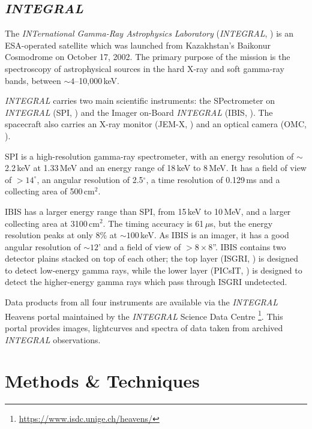 \subsection{\textit{INTEGRAL}}

\par The \textit{INTernational Gamma-Ray Astrophysics Laboratory} (\textit{INTEGRAL}, \citealp{Winkler_INTEGRAL}) is an ESA-operated satellite which was launched from Kazakhstan's Baikonur Cosmodrome on October 17, 2002.  The primary purpose of the mission is the spectroscopy of astrophysical sources in the hard X-ray and soft gamma-ray bands, between $\sim4$--10,000\,keV.
\par \textit{INTEGRAL} carries two main scientific instruments: the SPectrometer on \textit{INTEGRAL} (SPI, \citealp{Vedrenne_SPI}) and the Imager on-Board \textit{INTEGRAL} (IBIS, \citealp{Winkler_IBIS}).  The spacecraft also carries an X-ray monitor (JEM-X, \citealp{Schnopper_JEMX}) and an optical camera (OMC, \citealp{Gimenez_OMC}).
\par SPI is a high-resolution gamma-ray spectrometer, with an energy resolution of $\sim$2.2\,keV at 1.33\,MeV and an energy range of 18\,keV to 8\,MeV.  It has a field of view of $>14^\circ$, an angular resolution of 2.5$^\circ$, a time resolution of 0.129\,ms and a collecting area of 500\,cm$^2$.
\par IBIS has a larger energy range than SPI, from 15\,keV to 10\,MeV, and a larger collecting area at 3100\,cm$^2$.  The timing accuracy is 61\,$\mu$s, but the energy resolution peaks at only 8\% at $\sim100$\,keV.  As IBIS is an imager, it has a good angular resolution of $\sim12$' and a field of view of $>8\times8$''.  IBIS contains two detector plains stacked on top of each other; the top layer (ISGRI, \citealp{Lebrun_ISGRI}) is designed to detect low-energy gamma rays, while the lower layer (PICsIT, \citealp{Labanti_Picsit}) is designed to detect the higher-energy gamma rays which pass through ISGRI undetected.
\par Data products from all four instruments are available via the \textit{INTEGRAL} Heavens portal \citep{Lubinski_Heavens} maintained by the \textit{INTEGRAL} Science Data Centre \footnote{\url{https://www.isdc.unige.ch/heavens/}}.  This portal provides images, lightcurves and spectra of data taken from archived \textit{INTEGRAL} observations.

\section{Methods \& Techniques}

